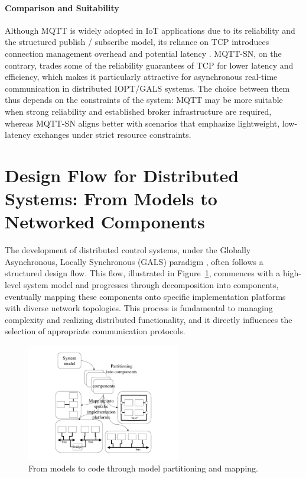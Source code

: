 \paragraph{Comparison and Suitability}
Although MQTT is widely adopted in IoT applications due to its reliability and the structured publish / subscribe model, its reliance on TCP introduces connection management overhead and potential latency \cite{banks2014mqtt}. MQTT-SN, on the contrary, trades some of the reliability guarantees of TCP for lower latency and efficiency, which makes it particularly attractive for asynchronous real-time communication in distributed IOPT/GALS systems. The choice between them thus depends on the constraints of the system: MQTT may be more suitable when strong reliability and established broker infrastructure are required, whereas MQTT-SN aligns better with scenarios that emphasize lightweight, low-latency exchanges under strict resource constraints.



 

\section{Design Flow for Distributed Systems: From Models to Networked Components }
\label{sec:design_flow}

The development of distributed control systems, under the Globally Asynchronous, Locally Synchronous (GALS) paradigm \cite{galsactd, galsborman}, often follows a structured design flow. This flow, illustrated in Figure~\ref{fig:model_to_code_mapping}, commences with a high-level system model and progresses through decomposition into components, eventually mapping these components onto specific implementation platforms with diverse network topologies. This process is fundamental to managing complexity and realizing distributed functionality, and it directly influences the selection of appropriate communication protocols.


\begin{figure}[htbp]
  \centering
 \includegraphics[width=0.6\textwidth]{Chapters/Figures/model_to_code_mapping.png}
  \caption{From models to code through model partitioning and mapping.}
  \label{fig:model_to_code_mapping}
\end{figure}


